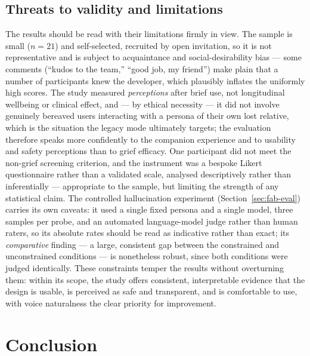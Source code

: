 \documentclass[11pt,a4paper]{report}
\begin{document}
\section{Threats to validity and limitations}
\label{sec:eval-limits}
The results should be read with their limitations firmly in view. The sample is small ($n=21$) and self-selected, recruited by open invitation, so it is not representative and is subject to acquaintance and social-desirability bias --- some comments (``kudos to the team,'' ``good job, my friend'') make plain that a number of participants knew the developer, which plausibly inflates the uniformly high scores. The study measured \emph{perceptions} after brief use, not longitudinal wellbeing or clinical effect, and --- by ethical necessity --- it did not involve genuinely bereaved users interacting with a persona of their own lost relative, which is the situation the legacy mode ultimately targets; the evaluation therefore speaks more confidently to the companion experience and to usability and safety perceptions than to grief efficacy. One participant did not meet the non-grief screening criterion, and the instrument was a bespoke Likert questionnaire rather than a validated scale, analysed descriptively rather than inferentially --- appropriate to the sample, but limiting the strength of any statistical claim. The controlled hallucination experiment (Section~\ref{sec:fab-eval}) carries its own caveats: it used a single fixed persona and a single model, three samples per probe, and an automated language-model judge rather than human raters, so its absolute rates should be read as indicative rather than exact; its \emph{comparative} finding --- a large, consistent gap between the constrained and unconstrained conditions --- is nonetheless robust, since both conditions were judged identically. These constraints temper the results without overturning them: within its scope, the study offers consistent, interpretable evidence that the design is usable, is perceived as safe and transparent, and is comfortable to use, with voice naturalness the clear priority for improvement.

\chapter{Conclusion}
\label{ch:conclusion}
\end{document}

